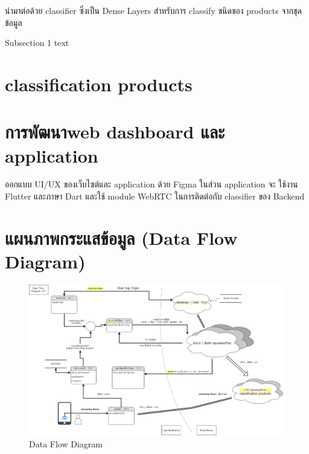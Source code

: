 นำมาต่อด้วย classifier ซึ่งเป็น Dense Layers สำหรับการ classify ชนิดของ products จากชุดข้อมูล


 

 

Subsection 1 text

\section{classification products}




\newpage
\section{การพัฒนาweb dashboard และ application }

ออกแบบ UI/UX ของเว็บไซต์และ application ด้วย Figma
ในส่วน application จะ  ใช้งาน Flutter และภาษา Dart และใช้ module  WebRTC ในการติดต่อกับ classifier ของ Backend

\section{แผนภาพกระแสข้อมูล (Data Flow Diagram)}
\begin{figure}[h]
  \begin{center}
  \includegraphics[scale=0.25]{pic/dataflow-lv0.png}
  \end{center}
  
  \caption[Data Flow Diagram]{Data Flow Diagram}
  \label{fig:Data Flow Diagram}
  \end{figure}
  

